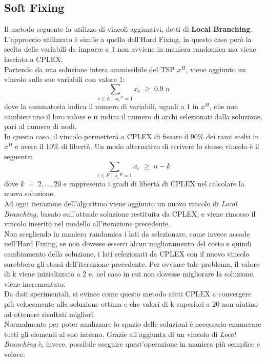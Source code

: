 \subsection{Soft Fixing}\label{soft_fixing}
Il metodo seguente fa utilizzo di vincoli aggiuntivi, detti di \textbf{Local Branching}\cite{local_branching}. L'approccio utilizzato è simile a quello dell'Hard Fixing, in questo caso però la scelta delle variabili da imporre a $1$ non avviene in maniera randomica ma viene lasciata a CPLEX.\\
Partendo da una soluzione intera ammissibile del TSP $x^H$, viene aggiunto un vincolo sulle sue variabili con valore $1$:\\
$$\underset{e\in E\; : \; {x_e}^{H}=1}\sum{x_e}\;\geq\; 0.9\;n$$
dove la sommatoria indica il numero di variabili, uguali a $1$ in $x^H$, che non cambieranno il loro valore e \textbf{n} indica il numero di archi selezionati dalla soluzione, pari al numero di nodi.\\
In questo caso, il vincolo permetterà a CPLEX di fissare il 90\% dei rami scelti in $x^H$ e avere il 10\% di libertà.
Un modo alternativo di scrivere lo stesso vincolo è il seguente:
$$\underset{e\in E\; : \; {x_e}^{H}=1}\sum{x_e}\;\geq\; n-k$$
dove $k\;=\;2,...,20$ e rappresenta i gradi di libertà di CPLEX nel calcolare la nuova soluzione.\\
Ad ogni iterazione dell'algoritmo viene aggiunto un nuovo vincolo di \textit{Local Branching}, basato sull'attuale soluzione restituita da CPLEX, e viene rimosso il vincolo inserito nel modello all'iterazione precedente.\\
Non scegliendo in maniera randomica i lati da selezionare, come invece accade nell'Hard Fixing, se non dovesse esserci alcun miglioramento del costo e quindi cambiamento della soluzione, i lati selezionati da CPLEX con il nuovo vincolo sarebbero gli stessi dell'iterazione precedente. Per ovviare tale problema, il valore di k viene inizializzato a 2 e, nel caso in cui non dovesse migliorare la soluzione, viene incrementato.\\
Da dati sperimentali, si evince come questo metodo aiuti CPLEX a convergere più velocemente alla soluzione ottima e che valori di k superiori a 20 non aiutino ad ottenere risultati migliori.\\
Normalmente per poter analizzare lo spazio delle soluzioni è necessario enumerare tutti gli elementi al suo interno. Grazie all'aggiunta di un vincolo di \textit{Local Branching} è, invece, possibile eseguire quest'operazione in maniera più semplice e veloce.\\ 
